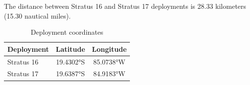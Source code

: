 
The distance between Stratus 16 and Stratus 17 deployments is 28.33 kilometers (15.30 nautical miles).

\begin{table}[ht]
\centering
\caption{Deployment coordinates}
\begin{tabular}{lcc}
\hline
\textbf{Deployment} & \textbf{Latitude} & \textbf{Longitude} \\
\hline
Stratus 16 & 19.4302°S & 85.0738°W \\
Stratus 17 & 19.6387°S & 84.9183°W \\
\hline
\end{tabular}
\end{table}
